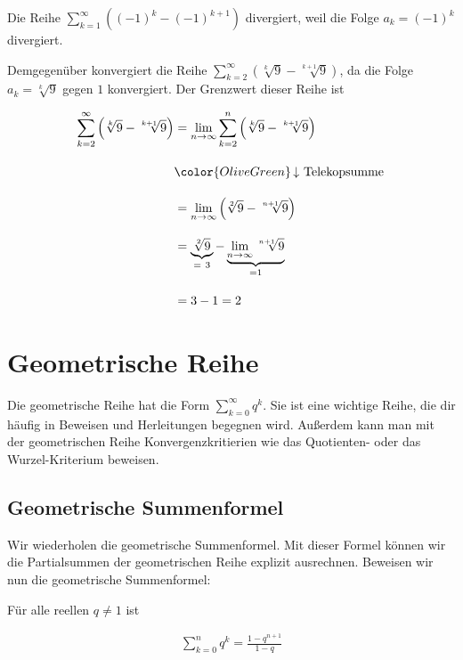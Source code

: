 \documentclass[fontsize=9pt,
               parskip=half-,
               DIV=14,
               listof=chapterentry,
               tocflat]{scrbook}
\begin{document}
\begin{example*}[Teleskopreihen]
Die Reihe $\sum _{k=1}^{\infty }\left((-1)^{k}-(-1)^{k+1}\right)$ divergiert, weil die Folge $a_{k}=(-1)^{k}$ divergiert.

Demgegenüber konvergiert die Reihe $\sum _{k=2}^{\infty }\left({\sqrt[{k}]{9}}-{\sqrt[{k+1}]{9}}\right)$, da die Folge $a_{k}={\sqrt[{k}]{9}}$ gegen $1$ konvergiert. Der Grenzwert dieser Reihe ist

\begin{align*}
\sum _{k=2}^{\infty }\left({\sqrt[{k}]{9}}-{\sqrt[{k+1}]{9}}\right)&=\lim _{n\to \infty }\sum _{k=2}^{n}\left({\sqrt[{k}]{9}}-{\sqrt[{k+1}]{9}}\right)\\[1em]&{\color {OliveGreen}\left\downarrow \ {\text{Telekopsumme}}\right.}\\[1em]&=\lim _{n\to \infty }\left({\sqrt[{2}]{9}}-{\sqrt[{n+1}]{9}}\right)\\[1em]&=\underbrace {\sqrt[{2}]{9}} _{=\ 3}-\underbrace {\lim _{n\to \infty }{\sqrt[{n+1}]{9}}} _{=1}\\[1em]&=3-1=2
\end{align*}

\end{example*}

\chapter{Geometrische Reihe}

Die geometrische Reihe hat die Form $\sum _{k=0}^{\infty }q^{k}$. Sie ist eine wichtige Reihe, die dir häufig in Beweisen und Herleitungen begegnen wird. Außerdem kann man mit der geometrischen Reihe Konvergenzkritierien wie das Quotienten- oder das Wurzel-Kriterium beweisen.

\section{Geometrische Summenformel}

Wir wiederholen die geometrische Summenformel. Mit dieser Formel können wir die Partialsummen der geometrischen Reihe explizit ausrechnen.  Beweisen wir nun die geometrische Summenformel:

\begin{theorem*}
Für alle reellen $q\neq 1$ ist

\begin{align*}
\sum _{k=0}^{n}q^{k}={\frac {1-q^{n+1}}{1-q}}
\end{align*}

\end{theorem*}
\end{document}
